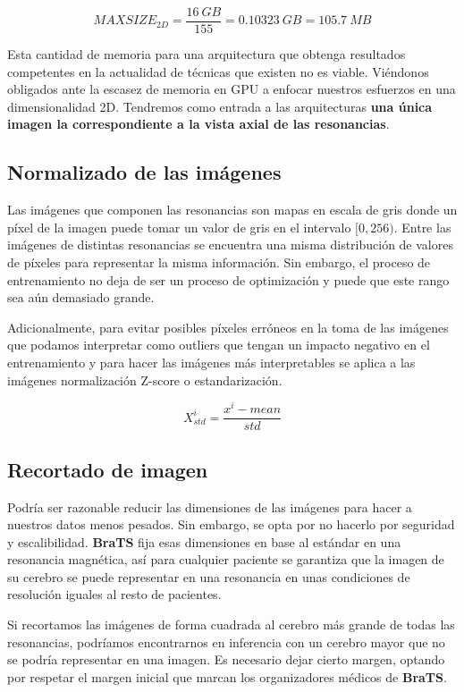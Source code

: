 $$ MAXSIZE_{2D} = \frac{16\ GB}{155}  = 0.10323\ GB = 105.7\ MB $$  

Esta cantidad de memoria para una arquitectura que obtenga resultados competentes en la actualidad de técnicas que existen no es viable. Viéndonos obligados ante la escasez de memoria en GPU a enfocar nuestros esfuerzos en una dimensionalidad 2D. Tendremos como entrada a las arquitecturas \textbf{una única imagen la correspondiente a la vista axial de las resonancias}.

\subsection{Normalizado de las imágenes}

Las imágenes que componen las resonancias son mapas en escala de gris donde un píxel de la imagen puede tomar un valor de gris en el intervalo $[0, 256)$. Entre las imágenes de distintas resonancias se encuentra una misma distribución de valores de píxeles para representar la misma información. Sin embargo, el proceso de entrenamiento no deja de ser un proceso de optimización y puede que este rango sea aún demasiado grande.

Adicionalmente, para evitar posibles píxeles erróneos en la toma de las imágenes que podamos interpretar como outliers que tengan un impacto negativo en el entrenamiento y para hacer las imágenes más interpretables se aplica a las imágenes normalización Z-score o estandarización.

$$ X_{std}^{i}= \frac{x^{i}-mean}{std} $$



\subsection{Recortado de imagen}

Podría ser razonable reducir las dimensiones de las imágenes para hacer a nuestros datos menos pesados. Sin embargo, se opta por no hacerlo por seguridad y escalibilidad. \textbf{BraTS} fija esas dimensiones en base al estándar en una resonancia magnética, así para cualquier paciente se garantiza que la imagen de su cerebro se puede representar en una resonancia en unas condiciones de resolución iguales al resto de pacientes.

Si recortamos las imágenes de forma cuadrada al cerebro más grande de todas las resonancias, podríamos encontrarnos en inferencia con un cerebro mayor que no se podría representar en una imagen. Es necesario dejar cierto margen, optando por respetar el margen inicial que marcan los organizadores médicos de \textbf{BraTS}.


